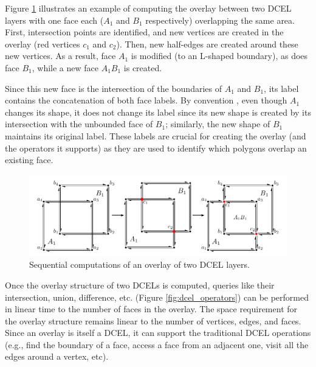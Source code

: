 Figure \ref{fig:dcel_seq} illustrates an example of computing the overlay between two DCEL layers with one face each ($A_1$ and $B_1$ respectively) overlapping the same area. First, intersection points are identified, and new vertices are created in the overlay (red vertices $c_1$ and $c_2$). Then, new half-edges are created around these new vertices. As a result, face $A_1$ is modified (to an L-shaped boundary), as does face $B_1$, while a new face $A_1B_1$ is created. 

Since this new face is the intersection of the boundaries of $A_1$ and $B_1$, its label contains the concatenation of both face labels. By convention \cite{berg_computational_2008}, even though $A_1$ changes its shape, it does not change its label since its new shape is created by its intersection with the unbounded face of $B_1$; similarly, the new shape of $B_1$ maintains its original label. These labels are crucial for creating the overlay (and the operators it supports) as they are used to identify which polygons overlap an existing face.

\begin{figure}
    \centering
    \includegraphics[width=\textwidth]{chapterSDCEL/dcel2/dcel2}
    \caption{Sequential computations of an overlay of two DCEL layers.}\label{fig:dcel_seq}
\end{figure}

Once the overlay structure of two DCELs is computed, queries like their intersection, union, difference, etc. (Figure \ref{fig:dcel_operators}) can be performed in linear time to the number of faces in the overlay. The space requirement for the overlay structure remains linear to the number of vertices, edges, and faces. Since an overlay is itself a DCEL, it can support the traditional DCEL operations (e.g., find the boundary of a face, access a face from an adjacent one, visit all the edges around a vertex, etc).

